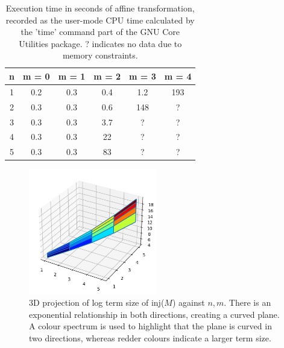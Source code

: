 \documentclass[12pt,a4paper]{report}
\theoremstyle{definition}
\theoremstyle{definition}
\theoremstyle{remark}
\begin{document}
\begin{table}[!ht]
  \centering
  \caption{Execution time in seconds of affine transformation, recorded as the user-mode CPU time calculated by the 'time' command part of the GNU Core Utilities package. ? indicates no data due to memory constraints.}
  \label{tab:timings}
  \begin{tabular}{c c c c c c}
    \toprule
    \textbf{n} & \textbf{m = 0} & \textbf{m = 1} & \textbf{m = 2} & \textbf{m = 3} & \textbf{m = 4}\\
    \midrule
    1 & 0.2 & 0.3 & 0.4 & 1.2 & 193\\
    2 & 0.3 & 0.3 & 0.6 & 148 & ?\\
    3 & 0.3 & 0.3 & 3.7 & ? & ?\\
    4 & 0.3 & 0.3 & 22 & ? & ?\\
    5 & 0.3 & 0.3 & 83 & ? & ?\\
    \bottomrule
  \end{tabular}
\end{table}

\begin{figure}[!ht]
    \centering
    \includegraphics[width=0.5\textwidth]{media/inj_term_size_plane.png}
    \caption{3D projection of log term size of inj($M$) against $n,m$. There is an exponential relationship in both directions, creating a curved plane. A colour spectrum is used to highlight that the plane is curved in two directions, whereas redder colours indicate a larger term size.}
    \label{fig:3d-plane-term-size}
\end{figure}
\end{document}

